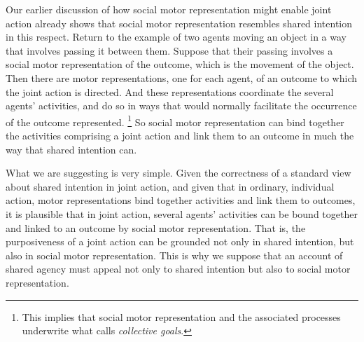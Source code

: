\documentclass[12pt,\papersize]{extarticle}
\begin{document}
Our earlier discussion of how social motor representation might enable joint action already shows that social motor representation resembles shared intention in this respect.
Return to the example of two agents moving an object in a way that involves passing it between them.
Suppose that their passing involves a social motor representation of the outcome,
which is the movement of the object. 
Then there are motor representations, one for each agent, 
of an outcome to which the joint action is directed.
And these representations coordinate the several agents' activities,
and 
do so in ways that would normally facilitate the occurrence of the  outcome represented.%
\footnote{
This implies that social motor representation and the associated processes underwrite what \citet{Butterfill:2011_wija} calls \textit{collective goals}.
}
So social motor representation can bind together the activities comprising a joint action and link them to an outcome in much the way that shared intention can.



What we are suggesting is very simple.
Given the correctness of a standard view about shared intention in joint action, 
and 
given that in ordinary, individual action, motor representations  bind together activities and link them to outcomes,
it is plausible that 
in joint action, several agents' activities can be bound together and linked to an outcome by social motor representation.
That is,
the purposiveness of a joint action can be grounded not only in shared intention, but also in social motor representation.
This is why we suppose that an account of shared agency must appeal not only to shared intention but also to social motor representation.
\end{document}
